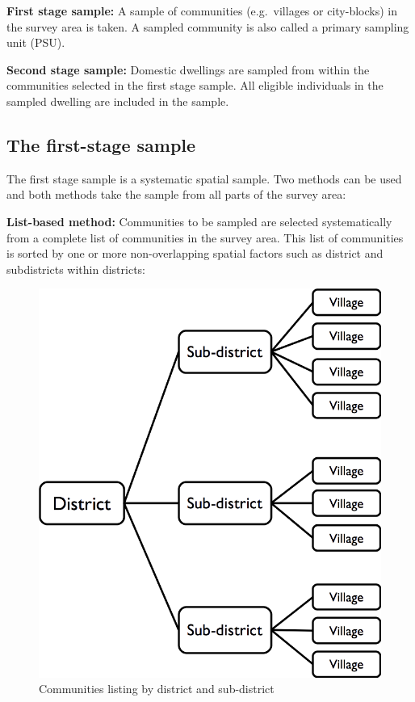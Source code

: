\documentclass[12pt,]{book}
\theoremstyle{definition}
\theoremstyle{definition}
\theoremstyle{definition}
\theoremstyle{remark}
\begin{document}
\textbf{First stage sample:} A sample of communities (e.g.~villages or
city-blocks) in the survey area is taken. A sampled community is also
called a primary sampling unit (PSU).

\textbf{Second stage sample:} Domestic dwellings are sampled from within
the communities selected in the first stage sample. All eligible
individuals in the sampled dwelling are included in the sample.

\hypertarget{the-first-stage-sample}{%
\subsection{The first-stage sample}\label{the-first-stage-sample}}

The first stage sample is a systematic spatial sample. Two methods can
be used and both methods take the sample from all parts of the survey
area:

\textbf{List-based method:} Communities to be sampled are selected
systematically from a complete list of communities in the survey area.
This list of communities is sorted by one or more non-overlapping
spatial factors such as district and subdistricts within districts:

\begin{figure}[h]

{\centering \includegraphics[width=9.72in]{figures/listSample1} 

}

\caption{Communities listing by district and sub-district}\label{fig:sample1}
\end{figure}
\end{document}
